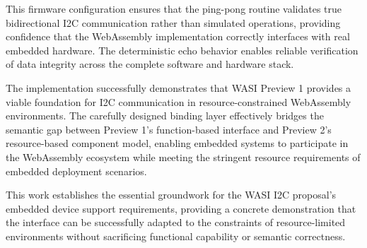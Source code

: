 This firmware configuration ensures that the ping-pong routine validates true bidirectional I2C communication rather than simulated operations, providing confidence that the WebAssembly implementation correctly interfaces with real embedded hardware. The deterministic echo behavior enables reliable verification of data integrity across the complete software and hardware stack.

The implementation successfully demonstrates that WASI Preview 1 provides a viable foundation for I2C communication in resource-constrained WebAssembly environments. The carefully designed binding layer effectively bridges the semantic gap between Preview 1's function-based interface and Preview 2's resource-based component model, enabling embedded systems to participate in the WebAssembly ecosystem while meeting the stringent resource requirements of embedded deployment scenarios.

This work establishes the essential groundwork for the WASI I2C proposal's embedded device support requirements, providing a concrete demonstration that the interface can be successfully adapted to the constraints of resource-limited environments without sacrificing functional capability or semantic correctness.